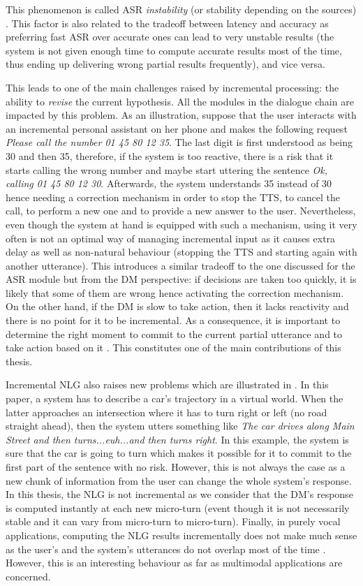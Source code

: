 		This phenomenon is called ASR \textit{instability} (or stability depending on the sources) \cite{Selfridge2011}. This factor is also related to the tradeoff between latency and accuracy as preferring fast ASR over accurate ones can lead to very unstable results (the system is not given enough time to compute accurate results most of the time, thus ending up delivering wrong partial results frequently), and vice versa.
		
This leads to one of the main challenges raised by incremental processing: the ability to \textit{revise} the current hypothesis. All the modules in the dialogue chain are impacted by this problem. As an illustration, suppose that the user interacts with an incremental personal assistant on her phone and makes the following request \textit{Please call the number 01 45 80 12 35}. The last digit is first understood as being 30 and then 35, therefore, if the system is too reactive, there is a risk that it starts calling the wrong number and maybe start uttering the sentence \textit{Ok, calling 01 45 80 12 30}. Afterwards, the system understands 35 instead of 30 hence needing a correction mechanism in order to stop the TTS, to cancel the call, to perform a new one and to provide a new answer to the user. Nevertheless, even though the system at hand is equipped with such a mechanism, using it very often is not an optimal way of managing incremental input as it causes extra delay as well as non-natural behaviour (stopping the TTS and starting again with another utterance). This introduces a similar tradeoff to the one discussed for the ASR module but from the DM perspective: if decisions are taken too quickly, it is likely that some of them are wrong hence activating the correction mechanism. On the other hand, if the DM is slow to take action, then it lacks reactivity and there is no point for it to be incremental. As a consequence, it is important to determine the right moment to commit to the current partial utterance and to take action based on it \cite{Raux2008,Lu2011}. This constitutes one of the main contributions of this thesis.

		Incremental NLG also raises new problems which are illustrated in \cite{Baumann2013}. In this paper, a system has to describe a car's trajectory in a virtual world. When the latter approaches an intersection where it has to turn right or left (no road straight ahead), then the system utters something like \textit{The car drives along Main Street and then turns...euh...and then turns right}. In this example, the system is sure that the car is going to turn which makes it possible for it to commit to the first part of the sentence with no risk. However, this is not always the case as a new chunk of information from the user can change the whole system's response. In this thesis, the NLG is not incremental as we consider that the DM's response is computed instantly at each new micro-turn (event though it is not necessarily stable and it can vary from micro-turn to micro-turn). Finally, in purely vocal applications, computing the NLG results incrementally does not make much sense as the user's and the system's utterances do not overlap most of the time \cite{Sacks1974}. However, this is an interesting behaviour as far as multimodal applications are concerned.

